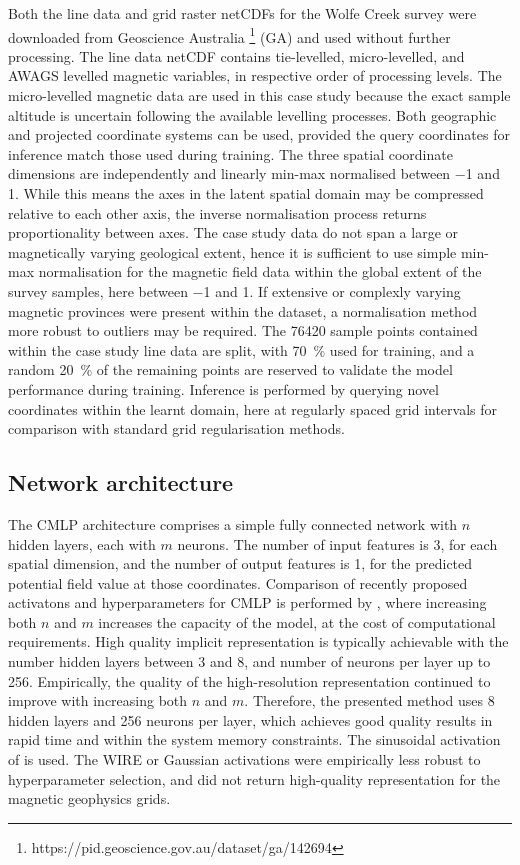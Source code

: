 \documentclass[manuscript.tex]{subfiles}
\begin{document}
Both the line data and grid raster netCDFs for the Wolfe Creek survey were downloaded from Geoscience Australia \footnote{https://pid.geoscience.gov.au/dataset/ga/142694} (GA) and used without further processing.
The line data netCDF contains tie-levelled, micro-levelled, and AWAGS levelled magnetic variables, in respective order of processing levels.
The micro-levelled magnetic data are used in this case study because the exact sample altitude is uncertain following the available levelling processes.
Both geographic and projected coordinate systems can be used, provided the query coordinates for inference match those used during training.
The three spatial coordinate dimensions are independently and linearly min-max normalised between \num{-1} and \num{1}.
While this means the axes in the latent spatial domain may be compressed relative to each other axis, the inverse normalisation process returns proportionality between axes.
The case study data do not span a large or magnetically varying geological extent, hence it is sufficient to use simple min-max normalisation for the magnetic field data within the global extent of the survey samples, here between \num{-1} and \num{1}.
If extensive or complexly varying magnetic provinces were present within the dataset, a normalisation method more robust to outliers may be required.
The \num{76420} sample points contained within the case study line data are split, with \qty{70}{\percent} used for training, and a random \qty{20}{\percent} of the remaining points are reserved to validate the model performance during training.
Inference is performed by querying novel coordinates within the learnt domain, here at regularly spaced grid intervals for comparison with standard grid regularisation methods.

\subsection{Network architecture}
The CMLP architecture comprises a simple fully connected network with \(n\) hidden layers, each with \(m\) neurons. %
The number of input features is 3, for each spatial dimension, and the number of output features is 1, for the predicted potential field value at those coordinates.
Comparison of recently proposed activatons and hyperparameters for CMLP is performed by \textcite{saragadamWIREWaveletImplicit2023}, where increasing both \(n\) and \(m\) increases the capacity of the model, at the cost of computational requirements.
High quality implicit representation is typically achievable with the number hidden layers between \num{3} and \num{8}, and number of neurons per layer up to \num{256}.
Empirically, the quality of the high-resolution representation continued to improve with increasing both \(n\) and \(m\).
Therefore, the presented method uses \num{8} hidden layers and \num{256} neurons per layer, which achieves good quality results in rapid time and within the system memory constraints.
The sinusoidal activation of \textcite{sitzmann2019siren} is used.
The WIRE or Gaussian activations were empirically less robust to hyperparameter selection, and did not return high-quality representation for the magnetic geophysics grids.
\end{document}
